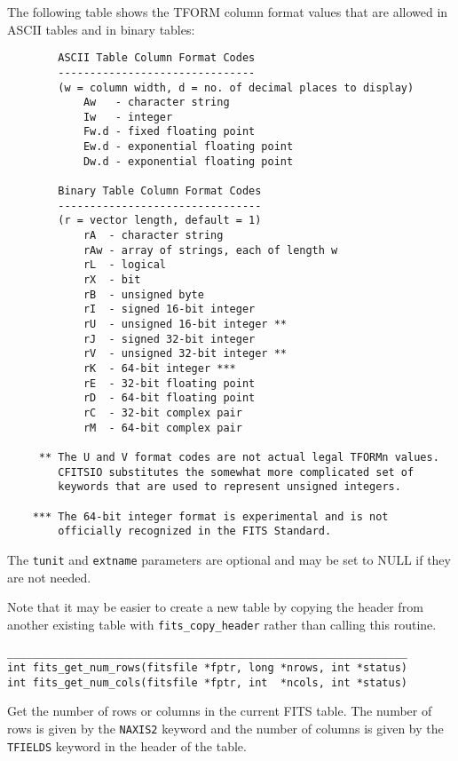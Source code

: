 \documentclass[11pt]{article}
\begin{document}
The following table
shows the TFORM column format values that are allowed in ASCII tables
and in binary tables:
\begin{verbatim}
        ASCII Table Column Format Codes
        -------------------------------
        (w = column width, d = no. of decimal places to display)
            Aw   - character string
            Iw   - integer
            Fw.d - fixed floating point
            Ew.d - exponential floating point
            Dw.d - exponential floating point

        Binary Table Column Format Codes
        --------------------------------
        (r = vector length, default = 1)
            rA  - character string
            rAw - array of strings, each of length w
            rL  - logical
            rX  - bit
            rB  - unsigned byte
            rI  - signed 16-bit integer
            rU  - unsigned 16-bit integer **
            rJ  - signed 32-bit integer
            rV  - unsigned 32-bit integer **
            rK  - 64-bit integer ***
            rE  - 32-bit floating point
            rD  - 64-bit floating point
            rC  - 32-bit complex pair
            rM  - 64-bit complex pair

     ** The U and V format codes are not actual legal TFORMn values.
        CFITSIO substitutes the somewhat more complicated set of
        keywords that are used to represent unsigned integers.

    *** The 64-bit integer format is experimental and is not 
        officially recognized in the FITS Standard.
\end{verbatim}
  
The {\tt tunit} and {\tt extname} parameters are optional and
may be set to NULL
if they are not needed.  

Note that it may be easier to create a new table by copying the
header from another existing table with {\tt fits\_copy\_header} rather
than calling this routine.

\begin{verbatim}
_______________________________________________________________
int fits_get_num_rows(fitsfile *fptr, long *nrows, int *status)
int fits_get_num_cols(fitsfile *fptr, int  *ncols, int *status)
\end{verbatim}

Get the number of rows or columns in the current FITS table.  The
number of rows is given by the {\tt NAXIS2} keyword and the number of columns
is given by the {\tt TFIELDS} keyword in the header of the table.
\end{document}
